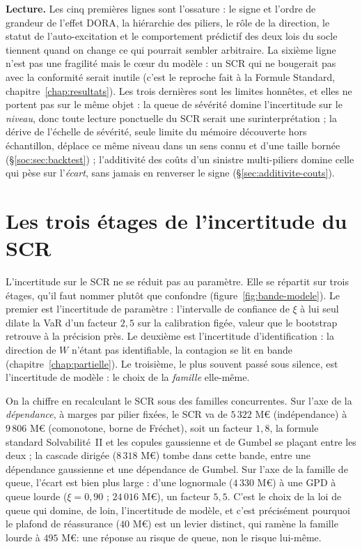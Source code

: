 \vspace{4pt}
\textbf{Lecture.} Les cinq premières lignes sont l'ossature : le signe et l'ordre
de grandeur de l'effet DORA, la hiérarchie des piliers, le rôle de la direction, le statut de
l'auto-excitation et le comportement prédictif des deux lois du socle tiennent quand on change ce
qui pourrait sembler arbitraire. La sixième ligne
n'est pas une fragilité mais le c\oe ur du modèle : un SCR qui ne bougerait pas avec la
conformité serait inutile (c'est le reproche fait à la Formule Standard,
chapitre~\ref{chap:resultats}). Les trois dernières sont les limites honnêtes, et elles ne portent
pas sur le même objet : la queue de sévérité domine l'incertitude sur le \emph{niveau}, donc toute
lecture ponctuelle du SCR serait une surinterprétation ; la dérive de l'échelle de sévérité, seule
limite du mémoire découverte hors échantillon, déplace ce même niveau dans un sens connu et d'une
taille bornée (\S\ref{soc:sec:backtest}) ; l'additivité des coûts d'un sinistre
multi-piliers domine celle qui pèse sur l'\emph{écart}, sans jamais en renverser le signe
(\S\ref{sec:additivite-couts}).




\section{Les trois étages de l'incertitude du SCR}
\label{sec:trois-etages}

L'incertitude sur le SCR ne se réduit pas au paramètre. Elle se répartit sur trois étages, qu'il
faut nommer plutôt que confondre (figure~\ref{fig:bande-modele}). Le premier est l'incertitude
de paramètre : l'intervalle de confiance de $\xi$ à lui seul dilate la VaR d'un facteur
$2{,}5$ sur la calibration figée, valeur que le bootstrap retrouve à la précision près.
Le deuxième est l'incertitude d'identification :
la direction de $W$ n'étant pas identifiable, la contagion se lit en bande
(chapitre~\ref{chap:partielle}). Le troisième, le plus souvent passé sous silence, est
l'incertitude de modèle : le choix de la \emph{famille} elle-même.

On la chiffre en recalculant le SCR sous des familles concurrentes. Sur l'axe de la
\emph{dépendance}, à marges par pilier fixées, le SCR va de $5\,322$ M\euro{} (indépendance) à
$9\,806$ M\euro{} (comonotone, borne de Fréchet), soit un facteur $1{,}8$, la formule standard
Solvabilité~II et les copules gaussienne et de Gumbel se plaçant entre les deux ; la cascade
dirigée ($8\,318$ M\euro) tombe dans cette bande, entre une dépendance gaussienne et une
dépendance de Gumbel. Sur l'axe de la famille de queue, l'écart est bien plus large :
d'une lognormale ($4\,330$ M\euro) à une GPD à queue lourde ($\xi=0{,}90$ ; $24\,016$ M\euro),
un facteur $5{,}5$. C'est le choix de la loi de queue qui domine, de loin, l'incertitude de
modèle, et c'est précisément pourquoi le plafond de réassurance ($40$ M\euro) est un levier
distinct, qui ramène la famille lourde à $495$ M\euro : une réponse au risque de queue, non le
risque lui-même.

